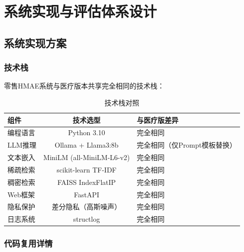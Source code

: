 \documentclass[11pt,a4paper]{ctexart}
\theoremstyle{remark}
\begin{document}
\newpage

\section{系统实现与评估体系设计}

\subsection{系统实现方案}

\subsubsection{技术栈}

零售HMAE系统与医疗版本共享完全相同的技术栈：

\begin{table}[H]
\centering
\caption{技术栈对照}
\begin{tabular}{lcl}
\toprule
\textbf{组件} & \textbf{技术选型} & \textbf{与医疗版差异} \\
\midrule
编程语言 & Python 3.10 & 完全相同 \\
LLM推理 & Ollama + Llama3:8b & 完全相同（仅Prompt模板替换） \\
文本嵌入 & MiniLM (all-MiniLM-L6-v2) & 完全相同 \\
稀疏检索 & scikit-learn TF-IDF & 完全相同 \\
稠密检索 & FAISS IndexFlatIP & 完全相同 \\
Web框架 & FastAPI & 完全相同 \\
隐私保护 & 差分隐私（高斯噪声） & 完全相同 \\
日志系统 & structlog & 完全相同 \\
\bottomrule
\end{tabular}
\end{table}

\subsubsection{代码复用详情}
\end{document}
